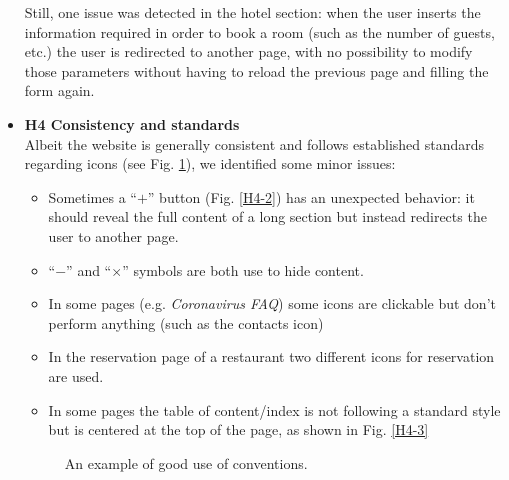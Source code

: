 \begin{itemize}
        Still, one issue was detected in the hotel section: when the user inserts the information required in order to book a room (such as the number of guests, etc.) the user is redirected to another page, with no possibility to modify those parameters without having to reload the previous page and filling the form again.
    \item \textbf{H4 Consistency and standards}\\
        Albeit the website is generally consistent and follows established standards regarding icons (see Fig. \ref{H4-1}), we identified some minor issues:
        \begin{itemize}
            \item Sometimes a ``$+$'' button (Fig. \ref{H4-2}) has an unexpected behavior: it should reveal the full content of a long section but instead redirects the user to another page.
            \item ``$-$'' and ``$\times$'' symbols are both use to hide content.
            \item In some pages (e.g. \emph{Coronavirus FAQ}) some icons are clickable but don't perform anything (such as the contacts icon)
            \item In the reservation page of a restaurant two different icons for reservation are used.
            \item In some pages the table of content/index is not following a standard style but is centered at the top of the page, as shown in Fig. \ref{H4-3}
        \end{itemize}
        \begin{figure}[!ht]
            \begin{minipage}{\linewidth}
                \centering
                \captionsetup{justification=centering}
                \caption{An example of good use of conventions.}
                \label{H4-1}
            \end{minipage}
        \end{figure}

\end{itemize}
